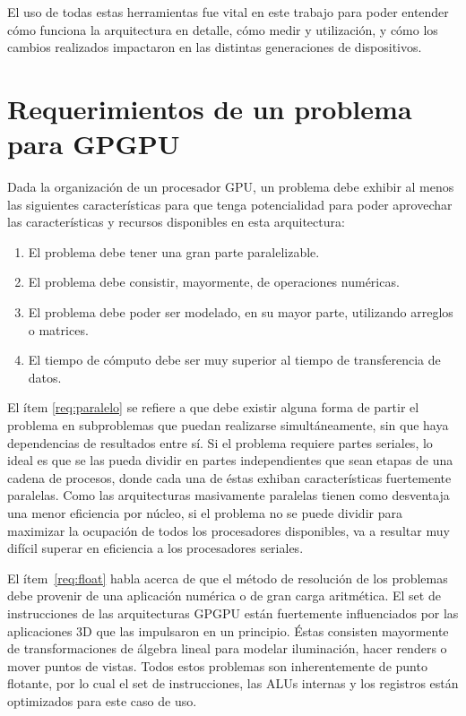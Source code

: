 El uso de todas estas herramientas fue vital en este trabajo para poder entender c\'omo funciona la arquitectura en detalle, c\'omo medir \performance{} y utilizaci\'on, y c\'omo los cambios realizados impactaron en las distintas generaciones de dispositivos.

\section{Requerimientos de un problema para GPGPU}

Dada la organizaci\'on de un procesador GPU, un problema debe exhibir al menos las siguientes caracter\'isticas para que tenga potencialidad para poder aprovechar las caracter\'isticas y recursos disponibles en esta arquitectura:

\begin{enumerate}
  \item \label{req:paralelo} El problema debe tener una gran parte paralelizable.
  \item \label{req:float} El problema debe consistir, mayormente, de operaciones num\'ericas.
  \item \label{req:matrix} El problema debe poder ser modelado, en su mayor parte, utilizando arreglos o matrices.
  \item \label{req:transf} El tiempo de c\'omputo debe ser muy superior al tiempo de transferencia de datos.
\end{enumerate}

El \'item \ref{req:paralelo} se refiere a que debe existir alguna forma de partir el problema en subproblemas que puedan realizarse simult\'aneamente, sin que haya dependencias de
resultados entre s\'i.
Si el problema requiere partes seriales, lo ideal es que se las pueda dividir en partes independientes que sean etapas de una cadena de procesos, donde cada una de \'estas exhiban caracter\'isticas fuertemente paralelas.
Como las arquitecturas masivamente paralelas tienen como desventaja una menor eficiencia por n\'ucleo, si el problema no se puede dividir para maximizar la ocupaci\'on de todos los procesadores disponibles, va a resultar muy dif\'icil superar en eficiencia a los procesadores seriales.

El \'item~\ref{req:float} habla acerca de que el m\'etodo de resoluci\'on de los problemas debe provenir de una aplicaci\'on num\'erica o de gran carga aritm\'etica.
El set de instrucciones de las arquitecturas GPGPU est\'an fuertemente influenciados por las aplicaciones 3D que las impulsaron en un principio.
\'Estas consisten mayormente de transformaciones de \'algebra lineal para modelar iluminaci\'on, hacer renders o mover puntos de vistas.
Todos estos problemas son inherentemente de punto flotante, por lo cual el set de instrucciones, las ALUs internas y los registros est\'an optimizados para este caso de uso.

